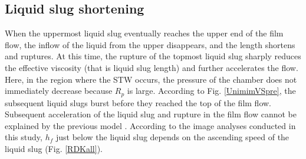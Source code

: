 \documentclass[aps,pre,preprint,groupedaddress,showkeys]{revtex4-2}
\begin{document}
\subsection{Liquid slug shortening}
When the uppermost liquid slug eventually reaches the upper end of the film flow, the inflow of the liquid from the upper disappears, and the length shortens and ruptures.
At this time, the rupture of the topmost liquid slug sharply reduces the effective viscosity (that is liquid slug length) and further accelerates the flow.
Here, in the region where the STW occurs, the pressure of the chamber does not immediately decrease because $ R_p $ is large.
According to Fig. \ref{UnimimVSpre}, the subsequent liquid slugs burst before they reached the top of the film flow.
Subsequent acceleration of the liquid slug and rupture in the film flow cannot be explained by the previous model \citep{kanno2018} .
According to the image analyses conducted in this study, $ h_f $ just below the liquid slug depends on the ascending speed of the liquid slug (Fig. \ref{RDKall}).
\end{document}
